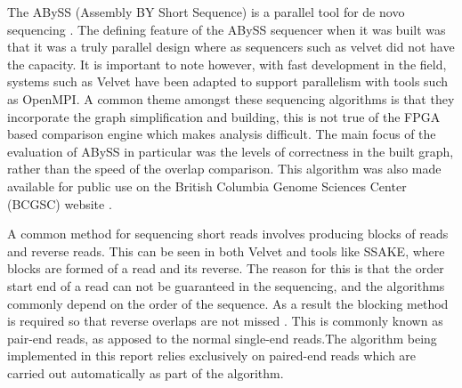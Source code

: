 The ABySS (Assembly BY Short Sequence) is a parallel tool for de novo sequencing \cite{simpson2009abyss}. The defining feature of the ABySS sequencer when it was built was that it was a truly parallel design where as sequencers such as velvet did not have the capacity. It is important to note however, with fast development in the field, systems such as Velvet have been adapted to support parallelism with tools such as OpenMPI. A common theme amongst these sequencing algorithms is that they incorporate the graph simplification and building, this is not true of the FPGA based comparison engine which makes analysis difficult. The main focus of the evaluation of ABySS in particular was the levels of correctness in the built graph, rather than the speed of the overlap comparison. This algorithm was also made available for public use on the British Columbia Genome Sciences Center (BCGSC) website \cite{ABYSSDOWNLOAD}.



A common method for sequencing short reads involves producing blocks of reads and reverse reads. This can be seen in both Velvet and tools like SSAKE, where blocks are formed of a read and its reverse. The reason for this is that the order start end of a read can not be guaranteed in the sequencing, and the algorithms commonly depend on the order of the sequence. As a result the blocking method is required so that reverse overlaps are not missed \cite{warren2007assembling}. This is commonly known as pair-end reads, as apposed to the normal single-end reads.The algorithm being implemented in this report relies exclusively on paired-end reads which are carried out automatically as part of the algorithm.



